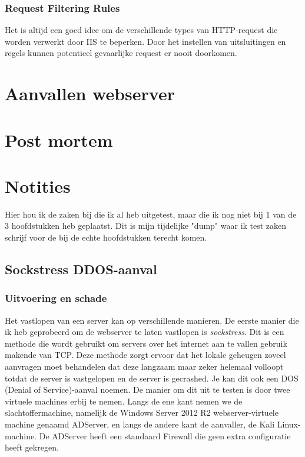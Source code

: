 \documentclass[pdftex,a4paper,12pt]{report}
\begin{document}
\subsection{Request Filtering Rules}
Het is altijd een goed idee om de verschillende types van HTTP-request die worden verwerkt door IIS te beperken. Door het instellen van uitsluitingen en regels kunnen potentieel gevaarlijke request er nooit doorkomen.


\chapter{Aanvallen webserver}

\chapter{Post mortem}


\chapter{Notities}
Hier hou ik de zaken bij die ik al heb uitgetest, maar die ik nog niet bij 1 van de 3 hoofdstukken heb geplaatst. Dit is mijn tijdelijke "dump" waar ik test zaken schrijf voor de bij de echte hoofdstukken terecht komen.
\newpage
\section{Sockstress DDOS-aanval}
\subsection{Uitvoering en schade}
Het vastlopen van een server kan op verschillende manieren. De eerste manier die ik heb geprobeerd om de webserver te laten vastlopen is \textit{sockstress}. Dit is een methode die wordt gebruikt om servers over het internet aan te vallen gebruik makende van TCP. Deze methode zorgt ervoor dat het lokale geheugen zoveel aanvragen moet behandelen dat deze langzaam maar zeker helemaal volloopt totdat de server is vastgelopen en de server is gecrashed. Je kan dit ook een DOS (Denial of Service)-aanval noemen. De manier om dit uit te testen is door twee virtuele machines erbij te nemen. Langs de ene kant nemen we de slachtoffermachine, namelijk de Windows Server 2012 R2 webserver-virtuele machine genaamd ADServer, en langs de andere kant de aanvaller, de Kali Linux-machine. De ADServer heeft een standaard Firewall die geen extra configuratie heeft gekregen. \newline \newline 
\end{document}
